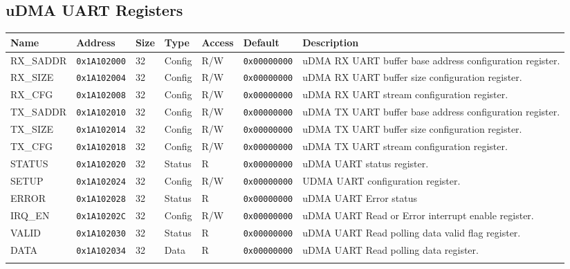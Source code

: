 
\subsection{uDMA UART Registers}
{\small
\begin{tabularx}{\textwidth}{|l|l|l|l|l|l|X|}
  \hline
  \textbf{Name} & \textbf{Address}  & \textbf{Size} & \textbf{Type} & \textbf{Access} & \textbf{Default} & \textbf{Description} \\
  \hline
  RX\_SADDR & \texttt{0x1A102000} & 32 & Config & R/W & \texttt{0x00000000} & uDMA RX UART buffer base address configuration register.\\
  \hline
  RX\_SIZE & \texttt{0x1A102004} & 32 & Config & R/W & \texttt{0x00000000} & uDMA RX UART buffer size configuration register.\\
  \hline
  RX\_CFG & \texttt{0x1A102008} & 32 & Config & R/W & \texttt{0x00000000} & uDMA RX UART stream configuration register.\\
  \hline
  TX\_SADDR & \texttt{0x1A102010} & 32 & Config & R/W & \texttt{0x00000000} & uDMA TX UART buffer base address configuration register.\\
  \hline
  TX\_SIZE & \texttt{0x1A102014} & 32 & Config & R/W & \texttt{0x00000000} & uDMA TX UART buffer size configuration register.\\
  \hline
  TX\_CFG & \texttt{0x1A102018} & 32 & Config & R/W & \texttt{0x00000000} & uDMA TX UART stream configuration register.\\
  \hline
  STATUS & \texttt{0x1A102020} & 32 & Status & R & \texttt{0x00000000} & uDMA UART status register.\\
  \hline
  SETUP & \texttt{0x1A102024} & 32 & Config & R/W & \texttt{0x00000000} & UDMA UART configuration register.\\
  \hline
  ERROR & \texttt{0x1A102028} & 32 & Status & R & \texttt{0x00000000} & uDMA UART Error status\\
  \hline
  IRQ\_EN & \texttt{0x1A10202C} & 32 & Config & R/W & \texttt{0x00000000} & uDMA UART Read or Error interrupt enable register.\\
  \hline
  VALID & \texttt{0x1A102030} & 32 & Status & R & \texttt{0x00000000} & uDMA UART Read polling data valid flag register.\\
  \hline
  DATA & \texttt{0x1A102034} & 32 & Data & R & \texttt{0x00000000} & uDMA UART Read polling data register.\\
  \hline
  \caption{uDMA UART}
\end{tabularx}
}


